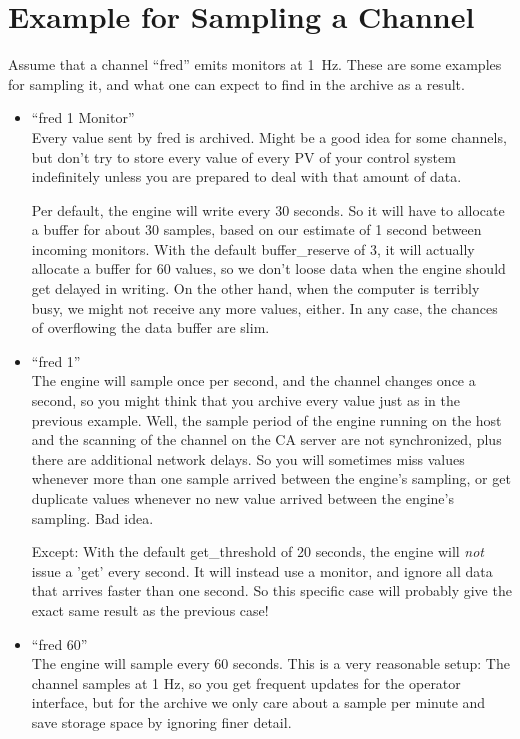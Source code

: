 \section{Example for Sampling a Channel}
Assume that a channel ``fred'' emits monitors at 1~Hz.
These are some examples for sampling it, and what one can expect to
find in the archive as a result.
\begin{itemize}
\item ``fred 1 Monitor''\\
      Every value sent by fred is archived. Might be a good idea for
      some channels, but don't try to store every value of every PV
      of your control system indefinitely unless you are prepared to
      deal with that amount of data.

      Per default, the engine will write every 30 seconds. So it will
      have to allocate a buffer for about 30 samples, based on our
      estimate of 1 second between incoming monitors.
      With the default buffer\_reserve of 3, it will actually allocate
      a buffer for 60 values, so we don't loose data when the engine
      should get delayed in writing. On the other hand, when the
      computer is terribly busy, we might not receive any more values,
      either. In any case, the chances of overflowing the data buffer
      are slim.
\item ``fred 1''\\
      The engine will sample once per second, and the channel changes
      once a second, so you might think that you archive every value
      just as in the previous example.  Well, the sample period of the
      engine running on the host and the scanning of the channel on
      the CA server are not synchronized, plus there are additional
      network delays. So you will sometimes miss values whenever more
      than one sample arrived between the engine's sampling, or get
      duplicate values whenever no new value arrived between the
      engine's sampling. Bad idea.

      Except: With the default get\_threshold of 20 seconds, the engine
      will \emph{not} issue a 'get' every second. It will instead use a
      monitor, and ignore all data that arrives faster than one
      second. So this specific case will probably give the exact same result
      as the previous case!
\item ``fred 60''\\
      The engine will sample every 60 seconds. This is a very
      reasonable setup: The channel samples at 1 Hz, so you get
      frequent updates for the operator interface, but for the archive
      we only care about a sample per minute and save storage space by
      ignoring finer detail.


\end{itemize}
